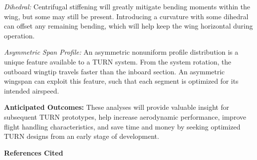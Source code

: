 \documentclass[11pt]{article}
\begin{document}
\emph{Dihedral:}
Centrifugal stiffening will greatly mitigate bending moments within the wing, but some may still be present.  Introducing a curvature with some dihedral can offset any remaining bending, which will help keep the wing horizontal during operation.

\emph{Asymmetric Span Profile:}
An asymmetric nonuniform profile distribution is a unique feature available to a TURN system.  From the system rotation, the outboard wingtip travels faster than the inboard section.  An asymmetric wingspan can exploit this feature, such that each segment is optimized for its intended airspeed.


{\bf Anticipated Outcomes:}
These analyses will provide valuable insight for subsequent TURN prototypes, help increase aerodynamic performance, improve flight handling characteristics, and save time and money by seeking optimized TURN designs from an early stage of development.








\newpage \cfoot{ }
{\color{red} \bf \Huge References Cited}
\end{document}
